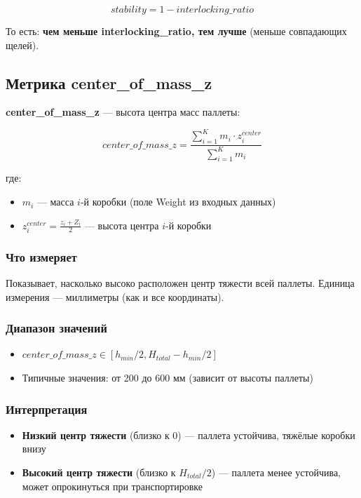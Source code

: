 $$stability = 1 - interlocking\_ratio$$

То есть: \textbf{чем меньше interlocking\_ratio, тем лучше} (меньше совпадающих щелей).

\subsection{Метрика center\_of\_mass\_z}

\textbf{center\_of\_mass\_z} --- высота центра масс паллеты:

$$center\_of\_mass\_z = \frac{\sum_{i=1}^{K} m_i \cdot z_i^{center}}{\sum_{i=1}^{K} m_i}$$

где:
\begin{itemize}
    \item $m_i$ --- масса $i$-й коробки (поле Weight из входных данных)
    \item $z_i^{center} = \frac{z_i + Z_i}{2}$ --- высота центра $i$-й коробки
\end{itemize}

\subsubsection{Что измеряет}

Показывает, насколько высоко расположен центр тяжести всей паллеты. Единица измерения --- миллиметры (как и все координаты).

\subsubsection{Диапазон значений}

\begin{itemize}
    \item $center\_of\_mass\_z \in [h_{min}/2, H_{total} - h_{min}/2]$
    \item Типичные значения: от 200 до 600 мм (зависит от высоты паллеты)
\end{itemize}

\subsubsection{Интерпретация}

\begin{itemize}
    \item \textbf{Низкий центр тяжести} (близко к 0) --- паллета устойчива, тяжёлые коробки внизу
    \item \textbf{Высокий центр тяжести} (близко к $H_{total}/2$) --- паллета менее устойчива, может опрокинуться при транспортировке
\end{itemize}

